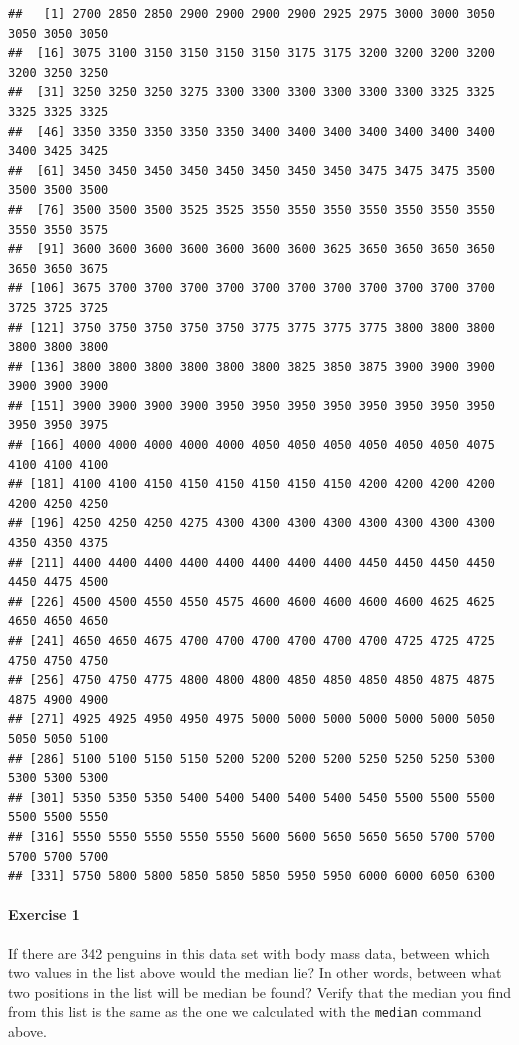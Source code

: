 \documentclass[
]{book}
\begin{document}
\begin{verbatim}
##   [1] 2700 2850 2850 2900 2900 2900 2900 2925 2975 3000 3000 3050 3050 3050 3050
##  [16] 3075 3100 3150 3150 3150 3150 3175 3175 3200 3200 3200 3200 3200 3250 3250
##  [31] 3250 3250 3250 3275 3300 3300 3300 3300 3300 3300 3325 3325 3325 3325 3325
##  [46] 3350 3350 3350 3350 3350 3400 3400 3400 3400 3400 3400 3400 3400 3425 3425
##  [61] 3450 3450 3450 3450 3450 3450 3450 3450 3475 3475 3475 3500 3500 3500 3500
##  [76] 3500 3500 3500 3525 3525 3550 3550 3550 3550 3550 3550 3550 3550 3550 3575
##  [91] 3600 3600 3600 3600 3600 3600 3600 3625 3650 3650 3650 3650 3650 3650 3675
## [106] 3675 3700 3700 3700 3700 3700 3700 3700 3700 3700 3700 3700 3725 3725 3725
## [121] 3750 3750 3750 3750 3750 3775 3775 3775 3775 3800 3800 3800 3800 3800 3800
## [136] 3800 3800 3800 3800 3800 3800 3825 3850 3875 3900 3900 3900 3900 3900 3900
## [151] 3900 3900 3900 3900 3950 3950 3950 3950 3950 3950 3950 3950 3950 3950 3975
## [166] 4000 4000 4000 4000 4000 4050 4050 4050 4050 4050 4050 4075 4100 4100 4100
## [181] 4100 4100 4150 4150 4150 4150 4150 4150 4200 4200 4200 4200 4200 4250 4250
## [196] 4250 4250 4250 4275 4300 4300 4300 4300 4300 4300 4300 4300 4350 4350 4375
## [211] 4400 4400 4400 4400 4400 4400 4400 4400 4450 4450 4450 4450 4450 4475 4500
## [226] 4500 4500 4550 4550 4575 4600 4600 4600 4600 4600 4625 4625 4650 4650 4650
## [241] 4650 4650 4675 4700 4700 4700 4700 4700 4700 4725 4725 4725 4750 4750 4750
## [256] 4750 4750 4775 4800 4800 4800 4850 4850 4850 4850 4875 4875 4875 4900 4900
## [271] 4925 4925 4950 4950 4975 5000 5000 5000 5000 5000 5000 5050 5050 5050 5100
## [286] 5100 5100 5150 5150 5200 5200 5200 5200 5250 5250 5250 5300 5300 5300 5300
## [301] 5350 5350 5350 5400 5400 5400 5400 5400 5450 5500 5500 5500 5500 5500 5550
## [316] 5550 5550 5550 5550 5550 5600 5600 5650 5650 5650 5700 5700 5700 5700 5700
## [331] 5750 5800 5800 5850 5850 5850 5950 5950 6000 6000 6050 6300
\end{verbatim}

\hypertarget{exercise-1-1}{%
\paragraph*{Exercise 1}\label{exercise-1-1}}

If there are 342 penguins in this data set with body mass data, between which two values in the list above would the median lie? In other words, between what two positions in the list will be median be found? Verify that the median you find from this list is the same as the one we calculated with the \texttt{median} command above.
\end{document}
